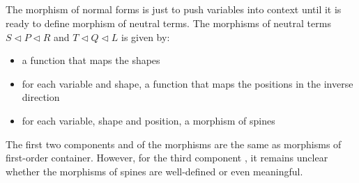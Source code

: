 \begin{code}
\AgdaSymbol{)}\<%
\\
\>[0]\<%
\\
%
\>[2]\AgdaSpace{}%
\AgdaSpace{}%
\AgdaSymbol{:}\AgdaSpace{}%
\AgdaSpace{}%
\AgdaSpace{}%
\AgdaSpace{}%
\AgdaSpace{}%
\AgdaSpace{}%
\AgdaSpace{}%
\AgdaSpace{}%
\AgdaSpace{}%
\AgdaSpace{}%
\AgdaSpace{}%
\AgdaSpace{}%
\<%
\\
\>[2][@{}l@{\AgdaIndent{0}}]%
\>[4]%
\>[8]\AgdaSymbol{:}\AgdaSpace{}%
\AgdaSpace{}%
\AgdaSpace{}%
\<%
\\
%
\>[4]\AgdaOperator{\AgdaInductiveConstructor{\AgdaUnderscore{},\AgdaUnderscore{}}}\AgdaSpace{}%
\AgdaSymbol{:}\AgdaSpace{}%
\AgdaSpace{}%
\AgdaSpace{}%
\AgdaSpace{}%
\AgdaSpace{}%
\AgdaSpace{}%
\AgdaSpace{}%
\AgdaSpace{}%
\AgdaSpace{}%
\AgdaSpace{}%
\AgdaSymbol{(}\AgdaSpace{}%
\AgdaOperator{\AgdaInductiveConstructor{,}}\AgdaSpace{}%
\AgdaSymbol{)}\AgdaSpace{}%
\AgdaSymbol{(}\AgdaSpace{}%
\AgdaOperator{\AgdaInductiveConstructor{,}}\AgdaSpace{}%
\AgdaSymbol{)}\<%
\end{code}

The morphism of normal forms is just to push variables into context until it is ready to define morphism of neutral terms. The morphisms of neutral terms $S \triangleleft P \triangleleft R$ and $T \triangleleft Q \triangleleft L$ is given by:

\begin{itemize}
  \item{a function that maps the shapes}
  \item{for each variable and shape, a function that maps the positions in the inverse direction}
  \item{for each variable, shape and position, a morphism of spines}
\end{itemize}

The first two components  and  of the morphisms are the same as morphisms of first-order container. However, for the third component , it remains unclear whether the morphisms of spines are well-defined or even meaningful.

